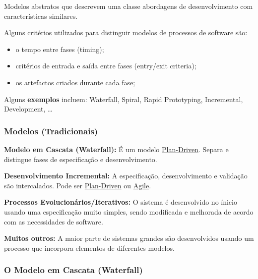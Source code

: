 \documentclass{article}
\begin{document}
Modelos abstratos que descrevem uma classe abordagens de desenvolvimento
com características similares.

\vspace{2mm}

Alguns critérios utilizados para distinguir modelos de processos
de software são:
\begin{itemize}
  \item o tempo entre fases (timing);
  \item critérios de entrada e saída entre fases (entry/exit criteria);
  \item os artefactos criados durante cada fase;
\end{itemize}

\vspace{2mm}

Alguns \textbf{exemplos} incluem: Waterfall, Spiral, Rapid Prototyping,
Incremental, Development, \dots

\subsubsection{Modelos (Tradicionais)}

\begin{flushleft}
  \textbf{Modelo em Cascata (Waterfall):} É um modelo \uline{Plan-Driven}.
  Separa e distingue fases de especificação e desenvolvimento.

  \vspace{2mm}

  \textbf{Desenvolvimento Incremental:} A especificação, desenvolvimento
  e validação são intercalados. Pode ser \uline{Plan-Driven} ou \uline{Agile}.

  \vspace{2mm}

  \textbf{Processos Evolucionários/Iterativos:} O sistema é desenvolvido
  no ínicio usando uma especificação muito simples, sendo modificada
  e melhorada de acordo com as necessidades de software.

  \vspace{2mm}

  \textbf{Muitos outros:} A maior parte de sistemas grandes são desenvolvidos
  usando um processo que incorpora elementos de diferentes modelos.
\end{flushleft}

\pagebreak

\subsubsection{O Modelo em Cascata (Waterfall)}
\end{document}
